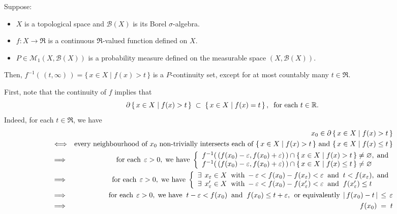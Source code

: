 \vskip 0.3cm
\begin{lemma}
\label{LemmaContinuitySetCountableExceptions}
\mbox{}
\vskip 0.1cm
\noindent
Suppose:
\begin{itemize}
\item	$X$ is a topological space and $\mathcal{B}(X)$ is its Borel $\sigma$-algebra.
\item	$f : X \longrightarrow \Re$ is a continuous $\Re$-valued function defined on $X$.
\item	$P \in \mathcal{M}_{1}\!\left(X,\mathcal{B}(X)\right)$ is a probability measure defined on
		the measurable space $\left(X,\mathcal{B}(X)\right)$.
\end{itemize}
Then,
$f^{-1}\!\left(\,(t,\infty)\,\right) = \{\,x\in X \;\vert\; f(x) > t\,\}$ is a $P$-continuity set,
except for at most countably many $t \in \Re$.
\end{lemma}
\proof
\vskip 0.2cm
\noindent
First, note that the continuity of $f$ implies that
\begin{equation*}
\partial\left\{\,x \in X \;\vert\; f(x) > t\,\right\} \;\subset\; \left\{\,x \in X \;\vert\; f(x) = t\,\right\},
\;\;\textnormal{for each $t \in \Re$}.
\end{equation*}
Indeed, for each $t \in \Re$, we have
\begin{eqnarray*}
&&
	x_{0} \in \partial\left\{\,x \in X \;\vert\; f(x) > t\,\right\}
\\	
&\Longleftrightarrow&
	\textnormal{every neighbourhood of $x_{0}$ non-trivially intersects each of
	$\left\{\,x \in X \;\vert\; f(x) > t\,\right\}$ and $\left\{\,x \in X \;\vert\; f(x) \leq t\,\right\}$}
\\
&\Longrightarrow&
	\textnormal{for each}\;\,\varepsilon > 0,\;\textnormal{we have}\;
	\left\{\begin{array}{l}
	f^{-1}\!\left(\,(f(x_{0})-\varepsilon,f(x_{0})+\varepsilon)\,\right) \cap \{\,x\in X\;\vert\;f(x) > t \,\} \neq \varemptyset,\;\textnormal{and}
	\\
	f^{-1}\!\left(\,(f(x_{0})-\varepsilon,f(x_{0})+\varepsilon)\,\right) \cap \{\,x\in X\;\vert\;f(x) \leq t \,\} \neq \varemptyset
	\end{array}\right.
\\
&\Longrightarrow&
	\textnormal{for each}\;\,\varepsilon > 0,\;\textnormal{we have}\;
	\left\{\begin{array}{l}
		\exists\;\,x_{\varepsilon} \in X
		\;\;\textnormal{with}\; -\varepsilon < f(x_{0})-f(x_{\varepsilon}) < \varepsilon
		\;\;\textnormal{and}\;\; t < f(x_{\varepsilon}),\;\textnormal{and}
		\\
		\exists\;\,x'_{\varepsilon} \in X
		\;\;\textnormal{with}\; -\varepsilon < f(x_{0})-f(x'_{\varepsilon}) < \varepsilon
		\;\;\textnormal{and}\;\;f(x'_{\varepsilon}) \leq t
	\end{array}\right.
\\
&\Longrightarrow&
	\textnormal{for each}\;\,\varepsilon > 0,\;\textnormal{we have}\;\;
	t -\varepsilon < f(x_{0})\;\;\textnormal{and}\;\;f(x_{0}) \leq t + \varepsilon,
	\;\,\textnormal{or equivalently}\;\,\vert\, f(x_{0}) - t \,\vert \,\leq\, \varepsilon
\\
&\Longrightarrow&
	f(x_{0}) \;=\; t
\end{eqnarray*}
